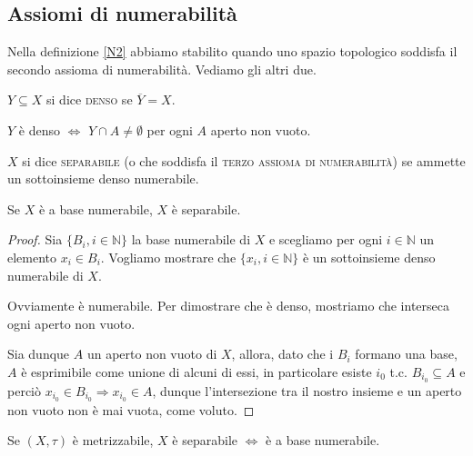 \documentclass{article}
\begin{document}
\subsection{Assiomi di numerabilità}

Nella definizione \ref{N2} abbiamo stabilito quando uno spazio topologico
soddisfa il secondo assioma di numerabilità. Vediamo gli altri due.

\begin{defn}
	$Y \subseteq X$ si dice \textsc{denso} se $\overline{Y}=X$.
\end{defn}

\begin{oss}
	$Y$ è denso $\Leftrightarrow$ $Y \cap A \not=\emptyset$ per ogni $A$ aperto
	non vuoto.
\end{oss}

\begin{defn} \label{N3}
	$X$ si dice \textsc{separabile} (o che soddisfa il \textsc{terzo assioma di
	numerabilità}) se ammette un sottoinsieme denso numerabile.
\end{defn}

\begin{prop} \label{N2impN3}
	Se $X$ è a base numerabile, $X$ è separabile.
\end{prop}

\begin{proof}
	Sia $\{ B_i, {i \in \mathbb{N}}\}$ la base numerabile di $X$ e scegliamo per
	ogni $i \in \mathbb{N}$ un elemento $x_i \in B_i$. Vogliamo mostrare che $\{
	x_i, i \in \mathbb{N} \}$ è un sottoinsieme denso numerabile di $X$.

	Ovviamente è numerabile. Per dimostrare che è denso, mostriamo che interseca
	ogni aperto non vuoto.

	Sia dunque $A$ un aperto non vuoto di $X$, allora, dato che i $B_i$ formano
	una base, $A$ è esprimibile come unione di alcuni di essi, in particolare
	esiste $i_0$ t.c. $B_{i_0} \subseteq A$ e perciò $x_{i_0} \in B_{i_0}
	\Rightarrow x_{i_0} \in A$, dunque l'intersezione tra il nostro insieme e un
	aperto non vuoto non è mai vuota, come voluto.
\end{proof}

\begin{prop} \label{metr-num}
	Se $(X, \tau)$ è metrizzabile, $X$ è separabile $\Leftrightarrow$ è a base
	numerabile.
\end{prop}
\end{document}
